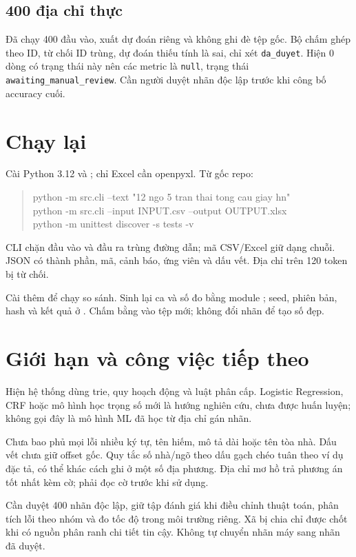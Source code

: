 \documentclass[12pt,a4paper]{article}
\begin{document}
\subsection{400 địa chỉ thực}
Đã chạy 400 đầu vào, xuất dự đoán riêng và không ghi đè tệp gốc. Bộ chấm ghép theo ID, từ chối ID trùng, dự đoán thiếu tính là sai, chỉ xét \texttt{da\_duyet}. Hiện 0 dòng có trạng thái này nên các metric là \texttt{null}, trạng thái \texttt{awaiting\_manual\_review}. Cần người duyệt nhãn độc lập trước khi công bố accuracy cuối.

\newpage
\section{Chạy lại}
Cài Python 3.12 và ; chỉ Excel cần openpyxl. Từ gốc repo:
\begin{quote}\small\ttfamily
python -m src.cli --text "12 ngo 5 tran thai tong cau giay hn"\\
python -m src.cli --input INPUT.csv --output OUTPUT.xlsx\\
python -m unittest discover -s tests -v
\end{quote}
CLI chặn đầu vào và đầu ra trùng đường dẫn; mã CSV/Excel giữ dạng chuỗi. JSON có thành phần, mã, cảnh báo, ứng viên và dấu vết. Địa chỉ trên 120 token bị từ chối.

Cài thêm  để chạy so sánh. Sinh lại ca và số đo bằng module ; seed, phiên bản, hash và kết quả ở . Chấm bằng  vào tệp mới; không đổi nhãn để tạo số đẹp.

\section{Giới hạn và công việc tiếp theo}
Hiện hệ thống dùng trie, quy hoạch động và luật phân cấp. Logistic Regression, CRF hoặc mô hình học trọng số mới là hướng nghiên cứu, chưa được huấn luyện; không gọi đây là mô hình ML đã học từ địa chỉ gán nhãn.

Chưa bao phủ mọi lỗi nhiều ký tự, tên hiếm, mô tả dài hoặc tên tòa nhà. Dấu vết chưa giữ offset gốc. Quy tắc số nhà/ngõ theo dấu gạch chéo tuân theo ví dụ đặc tả, có thể khác cách ghi ở một số địa phương. Địa chỉ mơ hồ trả phương án tốt nhất kèm cờ; phải đọc cờ trước khi sử dụng.

Cần duyệt 400 nhãn độc lập, giữ tập đánh giá khi điều chỉnh thuật toán, phân tích lỗi theo nhóm và đo tốc độ trong môi trường riêng. Xã bị chia chỉ được chốt khi có nguồn phân ranh chi tiết tin cậy. Không tự chuyển nhãn máy sang nhãn đã duyệt.
\end{document}
